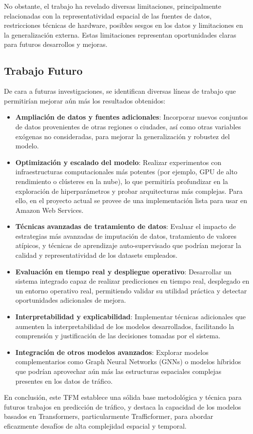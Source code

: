 No obstante, el trabajo ha revelado diversas limitaciones, principalmente relacionadas con la representatividad espacial de las fuentes de datos, restricciones técnicas de hardware, posibles sesgos en los datos y limitaciones en la generalización externa. Estas limitaciones representan oportunidades claras para futuros desarrollos y mejoras.

\subsection{Trabajo Futuro}

De cara a futuras investigaciones, se identifican diversas líneas de trabajo que permitirían mejorar aún más los resultados obtenidos:

\begin{itemize}
	\item \textbf{Ampliación de datos y fuentes adicionales}: Incorporar nuevos conjuntos de datos provenientes de otras regiones o ciudades, así como otras variables exógenas no consideradas, para mejorar la generalización y robustez del modelo.
	\item \textbf{Optimización y escalado del modelo}: Realizar experimentos con infraestructuras computacionales más potentes (por ejemplo, GPU de alto rendimiento o clústeres en la nube), lo que permitiría profundizar en la exploración de hiperparámetros y probar arquitecturas más complejas. Para ello, en el proyecto actual se provee de una implementación lista para usar en Amazon Web Services.
	\item \textbf{Técnicas avanzadas de tratamiento de datos}: Evaluar el impacto de estrategias más avanzadas de imputación de datos, tratamiento de valores atípicos, y técnicas de aprendizaje auto-supervisado que podrían mejorar la calidad y representatividad de los datasets empleados.
	\item \textbf{Evaluación en tiempo real y despliegue operativo}: Desarrollar un sistema integrado capaz de realizar predicciones en tiempo real, desplegado en un entorno operativo real, permitiendo validar su utilidad práctica y detectar oportunidades adicionales de mejora.
	\item \textbf{Interpretabilidad y explicabilidad}: Implementar técnicas adicionales que aumenten la interpretabilidad de los modelos desarrollados, facilitando la comprensión y justificación de las decisiones tomadas por el sistema.
	\item \textbf{Integración de otros modelos avanzados}: Explorar modelos complementarios como Graph Neural Networks (GNNs) o modelos híbridos que podrían aprovechar aún más las estructuras espaciales complejas presentes en los datos de tráfico.
\end{itemize}

En conclusión, este TFM establece una sólida base metodológica y técnica para futuros trabajos en predicción de tráfico, y destaca la capacidad de los modelos basados en Transformers, particularmente Trafficformer, para abordar eficazmente desafíos de alta complejidad espacial y temporal.


